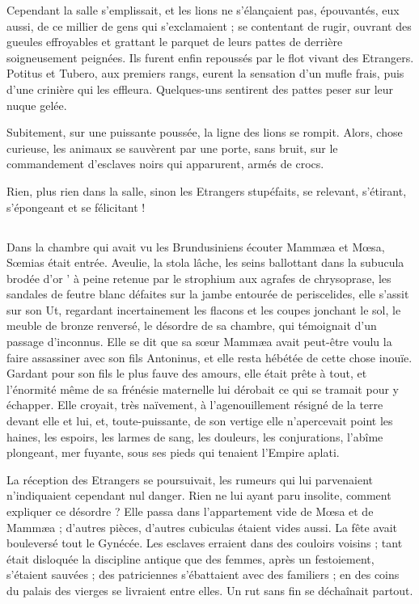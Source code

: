 \documentclass[a4paper, 11pt, oneside, polutonikogreek, french]{article}
\begin{document}
Cependant la salle s'emplissait, et les lions ne s'élançaient pas, épouvantés, eux aussi, de ce millier de gens qui s'exclamaient ; se contentant de rugir, ouvrant des gueules effroyables et grattant le parquet de leurs pattes de derrière soigneusement peignées. Ils furent enfin repoussés par le flot vivant des Etrangers. Potitus et Tubero, aux premiers rangs, eurent la sensation d'un mufle frais, puis d'une crinière qui les effleura. Quelques-uns sentirent des pattes peser sur leur nuque gelée.

Subitement, sur une puissante poussée, la ligne des lions se rompit. Alors, chose curieuse, les animaux se sauvèrent par une porte, sans bruit, sur le commandement d'esclaves noirs qui apparurent, armés de crocs.

Rien, plus rien dans la salle, sinon les Etrangers stupéfaits, se relevant, s'étirant, s'épongeant et se félicitant !
\clearpage
\subsection{}
\paragraph{}
Dans la chambre qui avait vu les Brundusiniens écouter Mammæa et Mœsa, Sœmias était entrée. Aveulie, la stola lâche, les seins ballottant dans la subucula brodée d'or ' à peine retenue par le strophium aux agrafes de chrysoprase, les sandales de feutre blanc défaites sur la jambe entourée de periscelides, elle s'assit sur son Ut, regardant incertainement les flacons et les coupes jonchant le sol, le meuble de bronze renversé, le désordre de sa chambre, qui témoignait d'un passage d'inconnus. Elle se dit que sa sœur Mammæa avait peut-être voulu la faire assassiner avec son fils Antoninus, et elle resta hébétée de cette chose inouïe. Gardant pour son fils le plus fauve des amours, elle était prête à tout, et l'énormité même de sa frénésie maternelle lui dérobait ce qui se tramait pour y échapper. Elle croyait, très naïvement, à l'agenouillement résigné de la terre devant elle et lui, et, toute-puissante, de son vertige elle n'apercevait point les haines, les espoirs, les larmes de sang, les douleurs, les conjurations, l'abîme plongeant, mer fuyante, sous ses pieds qui tenaient l'Empire aplati.

La réception des Etrangers se poursuivait, les rumeurs qui lui parvenaient n'indiquaient cependant nul danger. Rien ne lui ayant paru insolite, comment expliquer ce désordre ? Elle passa dans l'appartement vide de Mœsa et de Mammæa ; d'autres pièces, d'autres cubiculas étaient vides aussi. La fête avait bouleversé tout le Gynécée. Les esclaves erraient dans des couloirs voisins ; tant était disloquée la discipline antique que des femmes, après un festoiement, s'étaient sauvées ; des patriciennes s'ébattaient avec des familiers ; en des coins du palais des vierges se livraient entre elles. Un rut sans fin se déchaînait partout.
\end{document}
